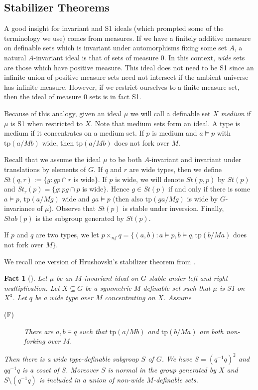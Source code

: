 \documentclass[12pt]{article}
\newtheorem{fact}[thm]{Fact}
\theoremstyle{definition}
\theoremstyle{mystyle}
\theoremstyle{remark}
\newcommand{\tp}{\mathrm{tp}}
\newcommand{\nf}{\times_{nf}}
\begin{document}
\subsection{Stabilizer Theorems}




A good insight for invariant and S1 ideals (which prompted some of
the terminology we use) comes from measures. If we have a finitely
additive measure on definable sets which is invariant under
automorphisms fixing some set $A$, a natural $A$-invariant ideal
is that of sets of measure 0. In this context, \emph{wide} sets
are those which have positive measure. This ideal does not need to
be S1 since an infinite union of positive measure sets need not
intersect if the ambient universe has infinite measure. However,
if we restrict ourselves to a finite measure set, then the ideal
of measure 0 sets is in fact S1.

Because of this analogy, given an ideal $\mu$ we will call a definable set $X$ \emph{medium}
if  $\mu$ is S1 when restricted to $X$. Note that medium sets form an ideal.
A type is medium if it concentrates on a medium set. If
$p$ is medium and $a\models p$ with
$\tp(a/Mb)$ wide, then $\tp(a/Mb)$ does not fork over $M$.

\bigskip

Recall that we assume the ideal $\mu$
to be both $A$-invariant and invariant under translations by elements of $G$.
If $q$ and $r$ are wide types, then we define $St(q,r):=\{g : gp
\cap r$ is wide$\}$. If $p$ is wide, we will denote $St(p,p)$ by
$St(p)$ and $St_r(p)= \{g : pg\cap p$ is wide$\}$. Hence $g\in
St(p)$ if and only if there is some $a\models p$, $\tp(a/Mg)$ wide
and $ga\models p$ (then also $\tp(ga/Mg)$ is wide by
$G$-invariance of $\mu$). Observe that $St(p)$ is stable under
inversion. Finally, $Stab(p)$ is the subgroup generated by
$St(p)$.

If $p$ and $q$ are two types, we let $p\nf q=\{(a,b) : a\models p, b\models q, \tp(b/Ma)$ does not fork over $M\}$.

\smallskip
We recall one version of Hrushovski's stabilizer theorem from
\cite{Hru12}.

\begin{fact}[\cite{Hru12}]\label{fact_stab}
Let $\mu$ be an $M$-invariant ideal on $G$ stable under left and right multiplication. Let $X\subseteq G$ be a symmetric $M$-definable set such that $\mu$ is S1 on $X^3$. Let $q$ be a wide type over $M$ concentrating on $X$. Assume

\begin{description}
\item[(F)] There are $a,b \models q$ such that $\tp(a/Mb)$ and $\tp(b/Ma)$ are both non-forking over $M$.
\end{description}
Then there is a wide type-definable subgroup $S$ of $G$. We have $S=(q^{-1}q)^2$ and $qq^{-1}q$ is a coset of $S$. Moreover $S$ is normal in the group generated by $X$ and $S\setminus (q^{-1}q)$ is included in a union of non-wide $M$-definable sets.
\end{fact}
\end{document}
